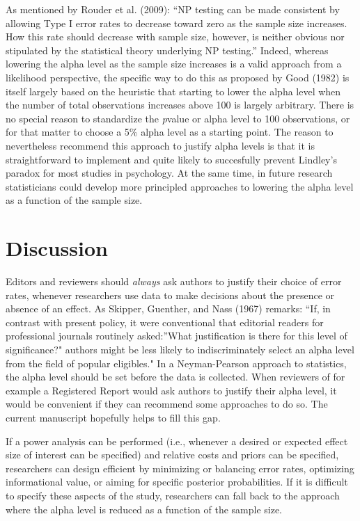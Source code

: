 \documentclass[
  english,
  ,jou,floatsintext]{apa6}
\begin{document}
As mentioned by Rouder et al. (2009): ``NP testing can be made consistent by allowing Type I error rates to decrease toward zero as the sample size increases. How this rate should decrease with sample size, however, is neither obvious nor stipulated by the statistical theory underlying NP testing.'' Indeed, whereas lowering the alpha level as the sample size increases is a valid approach from a likelihood perspective, the specific way to do this as proposed by Good (1982) is itself largely based on the heuristic that starting to lower the alpha level when the number of total observations increases above 100 is largely arbitrary. There is no special reason to standardize the \emph{p}value or alpha level to 100 observations, or for that matter to choose a 5\% alpha level as a starting point. The reason to nevertheless recommend this approach to justify alpha levels is that it is straightforward to implement and quite likely to succesfully prevent Lindley's paradox for most studies in psychology. At the same time, in future research statisticians could develop more principled approaches to lowering the alpha level as a function of the sample size.

\hypertarget{discussion}{%
\section{Discussion}\label{discussion}}

Editors and reviewers should \emph{always} ask authors to justify their choice of error rates, whenever researchers use data to make decisions about the presence or absence of an effect. As Skipper, Guenther, and Nass (1967) remarks: ``If, in contrast with present policy, it were conventional that editorial readers for professional journals routinely asked:''What justification is there for this level of significance?" authors might be less likely to indiscriminately select an alpha level from the field of popular eligibles." In a Neyman-Pearson approach to statistics, the alpha level should be set before the data is collected. When reviewers of for example a Registered Report would ask authors to justify their alpha level, it would be convenient if they can recommend some approaches to do so. The current manuscript hopefully helps to fill this gap.

If a power analysis can be performed (i.e., whenever a desired or expected effect size of interest can be specified) and relative costs and priors can be specified, researchers can design efficient by minimizing or balancing error rates, optimizing informational value, or aiming for specific posterior probabilities. If it is difficult to specify these aspects of the study, researchers can fall back to the approach where the alpha level is reduced as a function of the sample size.
\end{document}
